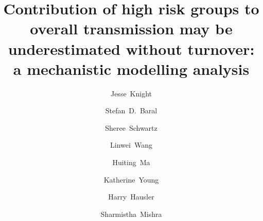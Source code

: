 \begin{frontmatter}
~\\[-6em] %
\title{Contribution of high risk groups to overall transmission
  may be underestimated without turnover:
  a mechanistic modelling analysis		 
}
\author[MAP]{Jesse~Knight}
\author[JHU]{Stefan~D.~Baral}
\author[JHU]{Sheree~Schwartz}
\author[MAP]{Linwei~Wang}
\author[MAP]{Huiting~Ma}
\author[THC]{Katherine~Young}  %
\author[THC]{Harry~Hausler}      
\author[MAP,IDM,IHP,IMS]{Sharmistha~Mishra}
\address[MAP]{MAP Centre for Urban Health Solutions, Unity Health Toronto}
\address[JHU]{Deptartment of Epidemiology, Johns Hopkins Bloomberg School of Public Health}
\address[THC]{TB HIV Care, South Africa}
\address[IDM]{Department of Medicine, Division of Infectious Disease, University of Toronto}
\address[IHP]{Institute of Health Policy, Management and Evaluation,
}
\end{frontmatter}
